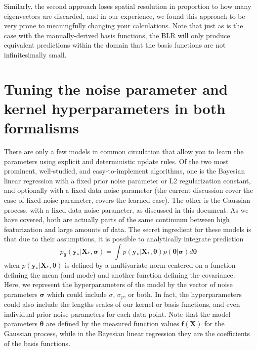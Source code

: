 \documentclass{article}
\begin{document}
Similarly, the second approach loses spatial resolution in proportion to how many eigenvectors are discarded, and in our experience, we found this approach to be very prone to meaningfully changing your calculations. Note that just as is the case with the manually-derived basis functions, the BLR will only produce equivalent predictions within the domain that the basis functions are not infinitesimally small.

\section{Tuning the noise parameter and kernel hyperparameters in both formalisms}\label{sec:hyperparameter_tuning}

There are only a few models in common circulation that allow you to learn the parameters using explicit and deterministic update rules. Of the two most prominent, well-studied, and easy-to-implement algorithms, one is the Bayesian linear regression with a fixed prior noise parameter or L2 regularization constant, and optionally with a fixed data noise parameter (the current discussion cover the case of fixed noise parameter, \cite{KoyoteScience} covers the learned case). The other is the Gaussian process, with a fixed data noise parameter, as discussed in this document. As we have covered, both are actually parts of the same continuum between high featurization and large amounts of data.  The secret ingredient for these models is that due to their assumptions, it is possible to analytically integrate prediction 
\begin{equation}
    p_{\boldsymbol{\theta}}(\mathbf{y}_\ast|\mathbf{X}_\ast,\boldsymbol{\sigma}) = \int p(\mathbf{y}_\ast|\mathbf{X}_\ast,\boldsymbol{\theta})p(\boldsymbol{\theta}|\boldsymbol{\sigma})d\boldsymbol{\theta}
\end{equation}when $p(\mathbf{y}_\ast|\mathbf{X}_\ast,\boldsymbol{\theta})$ is defined by a multivariate norm centered on a function defining the mean (and mode) and another function defining the covariance. Here, we represent the hyperparameters of the model by the vector of noise parameters $\boldsymbol{\sigma}$ which could include $\sigma$, $\sigma_p$, or both. In fact, the hyperparameters could also include the lengths scales of our kernel or basis functions, and even individual prior noise parameters for each data point. Note that the model parameters $\boldsymbol{\theta}$ are defined by the measured function values $\mathbf{f}(\mathbf{X})$ for the Gaussian process, while in the Bayesian linear regression they are the coefficients of the basis functions.  
\end{document}
